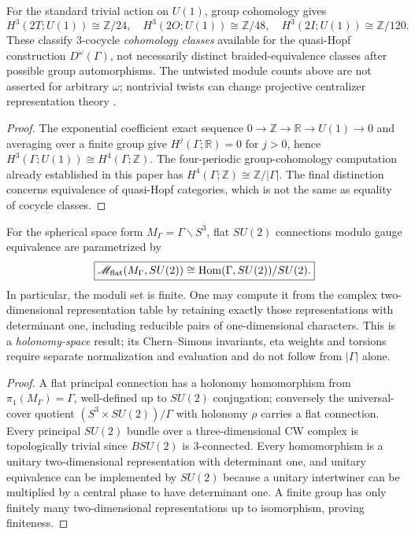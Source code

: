 \documentclass[11pt]{article}
\begin{document}
\begin{corollary}
\label{p1b:cor:v14-twisted-double-classes}
For the standard trivial action on $U(1)$, group cohomology gives
\[
 \boxed{H^3(2T;U(1))\cong\mathbb Z/24,\quad
 H^3(2O;U(1))\cong\mathbb Z/48,\quad
 H^3(2I;U(1))\cong\mathbb Z/120.}
\]
These classify $3$-cocycle \emph{cohomology classes} available for the
quasi-Hopf construction $D^\omega(\Gamma)$, not necessarily distinct
braided-equivalence classes after possible group automorphisms.
The untwisted module counts above are not asserted for arbitrary
$\omega$; nontrivial twists can change projective centralizer
representation theory \cite{DijkgraafPasquierRoche1991}.
\end{corollary}
\begin{proof}
The exponential coefficient exact sequence
$0\to\mathbb Z\to\mathbb R\to U(1)\to0$ and averaging over a
finite group give $H^j(\Gamma;\mathbb R)=0$ for $j>0$, hence
$H^3(\Gamma;U(1))\cong H^4(\Gamma;\mathbb Z)$.
The four-periodic group-cohomology computation already established in
this paper has $H^4(\Gamma;\mathbb Z)\cong\mathbb Z/|\Gamma|$.
The final distinction concerns equivalence of quasi-Hopf categories,
which is not the same as equality of cocycle classes.
\end{proof}

\begin{proposition}
\label{p1b:prop:v14-flat-su2-moduli}
For the spherical space form $M_\Gamma=\Gamma\backslash S^3$,
flat $SU(2)$ connections modulo gauge equivalence are parametrized by
\[
 \boxed{\mathscr M_{\rm flat}(M_\Gamma,SU(2))
       \cong\operatorname{Hom}(\Gamma,SU(2))/SU(2).}
\]
In particular, the moduli set is finite. One may compute it from the
complex two-dimensional representation table by retaining exactly
those representations with determinant one, including reducible pairs
of one-dimensional characters.  This is a \emph{holonomy-space} result;
its Chern--Simons invariants, eta weights and torsions require separate
normalization and evaluation and do not follow from $|\Gamma|$ alone.
\end{proposition}
\begin{proof}
A flat principal connection has a holonomy homomorphism from
$\pi_1(M_\Gamma)=\Gamma$, well-defined up to $SU(2)$ conjugation;
conversely the universal-cover quotient $(S^3\times SU(2))/\Gamma$
with holonomy $\rho$ carries a flat connection. Every principal
$SU(2)$ bundle over a three-dimensional CW complex is topologically
trivial since $BSU(2)$ is 3-connected.  Every homomorphism is a
unitary two-dimensional representation with determinant one, and
unitary equivalence can be implemented by $SU(2)$ because a unitary
intertwiner can be multiplied by a central phase to have determinant
one.  A finite group has only finitely many two-dimensional
representations up to isomorphism, proving finiteness.
\end{proof}
\end{document}
